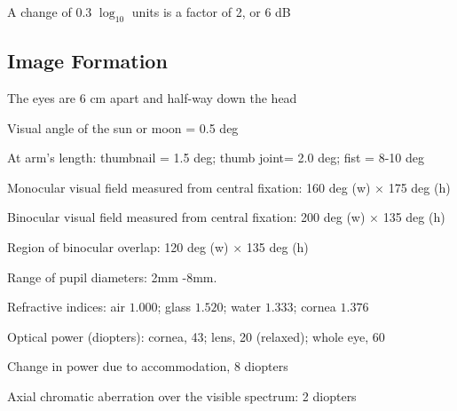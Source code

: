 \item A change of 0.3 $\log_{10}$ units is a factor of 2, or 6 dB

\ee

\subsection*{Image Formation}

\be

\item The eyes are 6 cm apart and half-way down the head

\item Visual angle of the sun or moon = 0.5 deg

\item At arm's length: thumbnail = 1.5 deg; thumb joint= 2.0 deg; fist
= 8-10 deg

\item Monocular visual field measured from central fixation: 
160 deg (w) $\times$ 175 deg (h)

\item Binocular visual field measured from central fixation: 200 deg
(w) $\times$ 135 deg (h) 

\item Region of binocular overlap: 120 deg (w) $\times$ 135 deg (h)

\item Range of pupil diameters:  2mm -8mm.

\item Refractive indices: air $1.000$; glass $1.520$; water $1.333$;
cornea $1.376$

\item Optical power (diopters): cornea, 43; lens, 20 (relaxed); whole eye, 60

\item Change in power due to accommodation, 8 diopters

\item Axial chromatic aberration over the visible spectrum: 2 diopters

